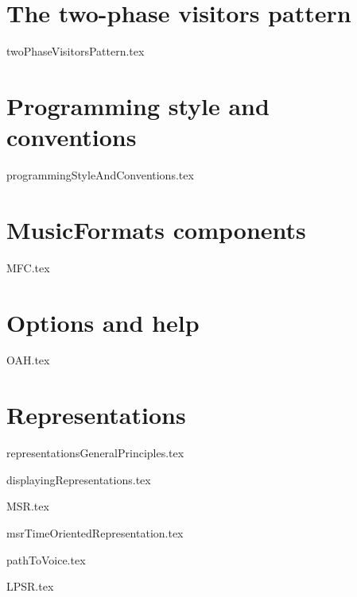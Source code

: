 \documentclass[11pt,a4paper]{report}
\begin{document}
\part{The two-phase visitors pattern}

{twoPhaseVisitorsPattern.tex}


\part{Programming style and conventions}

{programmingStyleAndConventions.tex}


\part{MusicFormats components}

{MFC.tex}


\part{Options and help}

{OAH.tex}


\part{Representations}

{representationsGeneralPrinciples.tex}

{displayingRepresentations.tex}

{MSR.tex}

{msrTimeOrientedRepresentation.tex}

{pathToVoice.tex}

{LPSR.tex}
\end{document}
